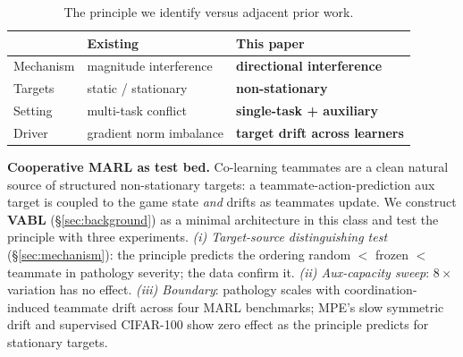 \documentclass{article}
\theoremstyle{plain}
\theoremstyle{definition}
\theoremstyle{remark}
\begin{document}
\begin{table}[t]
\centering
\small
\caption{The principle we identify versus adjacent prior work.}
\label{tab:contrast}
\begin{tabular}{lll}
\toprule
 & \textbf{Existing} & \textbf{This paper} \\
\midrule
Mechanism & magnitude interference & \textbf{directional interference} \\
Targets & static / stationary & \textbf{non-stationary} \\
Setting & multi-task conflict & \textbf{single-task + auxiliary} \\
Driver & gradient norm imbalance & \textbf{target drift across learners} \\
\bottomrule
\end{tabular}
\end{table}

\textbf{Cooperative MARL as test bed.} Co-learning teammates are a
clean natural source of structured non-stationary targets: a
teammate-action-prediction aux target is coupled to the game state
\emph{and} drifts as teammates update. We construct \textbf{VABL}
(\S\ref{sec:background}) as a minimal architecture in this class and
test the principle with three experiments.
\emph{(i) Target-source distinguishing test} (\S\ref{sec:mechanism}):
the principle predicts the ordering random $<$ frozen $<$ teammate in
pathology severity; the data confirm it. \emph{(ii) Aux-capacity
sweep}: $8\times$ variation has no effect. \emph{(iii) Boundary}:
pathology scales with coordination-induced teammate drift across four
MARL benchmarks; MPE's slow symmetric drift and supervised CIFAR-100
show zero effect as the principle predicts for stationary targets.
\end{document}
